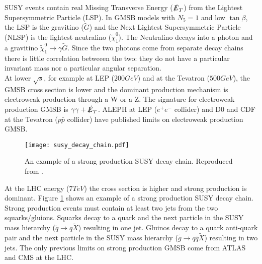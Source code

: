 SUSY events contain real Missing Transverse Energy ($\slashed{E}_{T}$) from the Lightest 
Supersymmetric Particle (LSP). In GMSB models with $N_{5} = 1$ and low
$\tan\beta$, the LSP is the gravitino ($\tilde{G}$) and the Next Lightest 
Supersymmetric Particle (NLSP) is the lightest neutralino 
($\tilde{\chi}_{1}^{0}$). The Neutralino decays into a photon and a gravitino 
$\tilde{\chi}_{1}^{0}\rightarrow\gamma\tilde{G}$. Since the two photons come from 
separate decay chains there is little correlation betweeen the two: they do not 
have a particular invariant mass nor a particular angular separation. \\

At lower $\sqrt{s}$, for example at LEP ($200\unit{GeV}$) and at the Tevatron
($500\unit{GeV}$), the GMSB cross section is lower and the dominant production 
mechanism is electroweak production through a W or a Z. The signature for 
electroweak production GMSB is $\gamma\gamma + \slashed{E}_{T}$. ALEPH \cite{aleph} at LEP 
($e^{+}e^{-}$ collider) and D0 \cite{d0} and CDF \cite{cdf} at the Tevatron 
($p\bar{p}$ collider) have published limits on electroweak production GMSB. \\

\begin{figure}
\begin{center}
\texttt{[image: susy\_decay\_chain.pdf]}
\end{center}
\caption{An example of a strong production SUSY decay chain. Reproduced from
\cite{gmsb_at_lhc}.}
\label{fig:susydecay}
\end{figure}

At the LHC energy ($7\unit{TeV}$) the cross section is higher and strong 
production is dominant. Figure \ref{fig:susydecay} shows an example of a strong 
production SUSY decay chain. Strong production events must contain at least two 
jets from the two squarks/gluions. Squarks decay to a quark and the next 
particle in the SUSY mass hierarchy ($\tilde{q}\rightarrow q\tilde{X}$) 
resulting in one jet. Gluinos decay to a quark anti-quark pair and the next 
particle in the SUSY mass hierarchy ($\tilde{g}\rightarrow q\bar{q}\tilde{X}$) 
resulting in two jets. The only previous limits on strong production GMSB come 
from ATLAS \cite{atlas} and CMS \cite{ra3} at the LHC. \\

